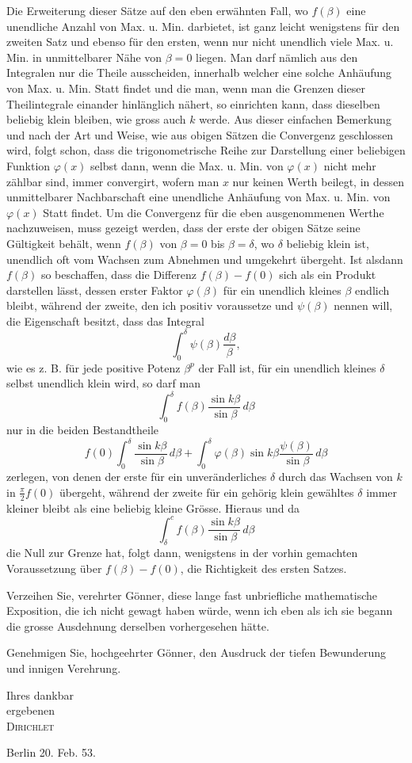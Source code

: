 \documentclass[11pt]{article}
\newcommand{\scn}[1]{\textsc{#1}}
\begin{document}
Die Erweiterung dieser Sätze auf den eben erwähnten Fall, wo $f(\beta)$ eine unendliche Anzahl von Max. u. Min. darbietet, ist ganz leicht wenigstens für den zweiten Satz und ebenso für den ersten, wenn nur nicht unendlich viele Max. u. Min. in unmittelbarer Nähe von $\beta=0$ liegen. Man darf nämlich aus den Integralen nur die Theile ausscheiden, innerhalb welcher eine solche Anhäufung von Max. u. Min. Statt findet und die man, wenn man die Grenzen dieser Theilintegrale einander hinlänglich nähert, so einrichten kann, dass dieselben beliebig klein bleiben, wie gross auch $k$ werde. Aus dieser einfachen Bemerkung und nach der Art und Weise, wie aus obigen Sätzen die Convergenz geschlossen wird, folgt schon, dass die trigonometrische Reihe zur Darstellung einer beliebigen Funktion $\varphi(x)$ selbst dann, wenn die Max. u. Min. von $\varphi(x)$ nicht mehr zählbar sind, immer convergirt, wofern man $x$ nur keinen Werth beilegt, in dessen unmittelbarer Nachbarschaft eine unendliche Anhäufung von Max. u. Min. von $\varphi(x)$ Statt findet. Um die Convergenz für die eben ausgenommenen Werthe nachzuweisen, muss gezeigt werden, dass der erste der obigen Sätze seine Gültigkeit behält, wenn $f(\beta)$ von $\beta=0$ bis $\beta=\delta$, wo $\delta$ beliebig klein ist, unendlich oft vom Wachsen zum Abnehmen und umgekehrt übergeht. Ist alsdann $f(\beta)$ so beschaffen, dass die Differenz $f(\beta)-f(0)$ sich als ein Produkt darstellen lässt, dessen erster Faktor $\varphi(\beta)$ für ein unendlich kleines $\beta$ endlich bleibt, während der zweite, den ich positiv voraussetze und $\psi(\beta)$ nennen will, die Eigenschaft besitzt, dass das Integral
\[
 \int_0^\delta \psi(\beta)\frac{d\beta}{\beta},
\]
wie es z. B. für jede positive Potenz $\beta^p$ der Fall ist, für ein unendlich kleines $\delta$ selbst unendlich klein wird, so darf man
\[
 \int_0^\delta f(\beta)\frac{\sin k\beta}{\sin\beta}\,d\beta
\]
nur in die beiden Bestandtheile
\[
 f(0)\int_0^\delta \frac{\sin k\beta}{\sin\beta}\,d\beta
 +\int_0^\delta \varphi(\beta)\sin k\beta\frac{\psi(\beta)}{\sin\beta}\,d\beta
\]
zerlegen, von denen der erste für ein unveränderliches $\delta$ durch das Wachsen von $k$ in $\frac\pi2 f(0)$ übergeht, während der zweite für ein gehörig klein gewähltes $\delta$ immer kleiner bleibt als eine beliebig kleine Grösse. Hieraus und da
\[
 \int_\delta^c f(\beta)\frac{\sin k\beta}{\sin\beta}\,d\beta
\]
die Null zur Grenze hat, folgt dann, wenigstens in der vorhin gemachten Voraussetzung über $f(\beta)-f(0)$, die Richtigkeit des ersten Satzes.

Verzeihen Sie, verehrter Gönner, diese lange fast unbriefliche mathematische Exposition, die ich nicht gewagt haben würde, wenn ich eben als ich sie begann die grosse Ausdehnung derselben vorhergesehen hätte.

Genehmigen Sie, hochgeehrter Gönner, den Ausdruck der tiefen Bewunderung und innigen Verehrung.

\begin{flushright}
Ihres dankbar\\
ergebenen\\
\scn{Dirichlet}
\end{flushright}
Berlin 20. Feb. 53.
\end{document}
